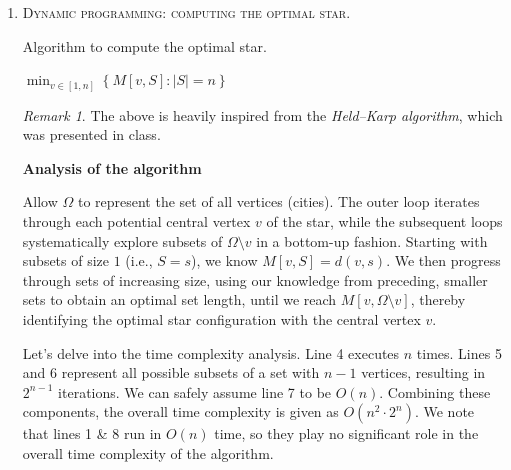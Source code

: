 \documentclass[12pt]{article}
\theoremstyle{definition}
\theoremstyle{remark}
\newtheorem*{remark}{Remark}
\begin{document}
\begin{enumerate}
  \newpage 
  \item \textsc{Dynamic programming: computing the optimal star.}  
  \begin{algorithm}
    \caption{Algorithm to compute the optimal star.}
    \BlankLine
    \BlankLine
{}
    \BlankLine
    
    \Return $\min_{v \in [1,n]} \left\{M[v, S] : |S| = n \right\}$


  \end{algorithm}

  \begin{remark} 
    The above is heavily inspired from the \textit{Held–Karp algorithm}, which was presented in class. 
  \end{remark}
  \textbf{Analysis of the algorithm}

\hspace{24pt} Allow $\Omega$ to represent the set of all vertices (cities). The outer loop iterates through each potential central vertex $v$ of the star, while the subsequent loops systematically explore subsets of $\Omega\setminus {v}$ in a bottom-up fashion. Starting with subsets of size $1$ (i.e., $S = {s}$), we know $M[v,S] = d(v, s)$. We then progress through sets of increasing size, using our knowledge from preceding, smaller sets to obtain an optimal set length, until we reach $M[v, \Omega\setminus v]$,  thereby identifying the optimal star configuration with the central vertex $v$. 

\hspace{24pt} Let's delve into the time complexity analysis. Line 4 executes $n$ times. Lines 5 and 6 represent all possible subsets of a set with $n-1$ vertices, resulting in $2^{n-1}$ iterations. We can safely assume line 7 to be $O(n)$. Combining these components, the overall time complexity is given as $O(n^2 \cdot 2^n)$. We note that lines 1 \& 8 run in $O(n)$ time, so they play no significant role in the overall time complexity of the algorithm. 


\end{enumerate}
\end{document}
